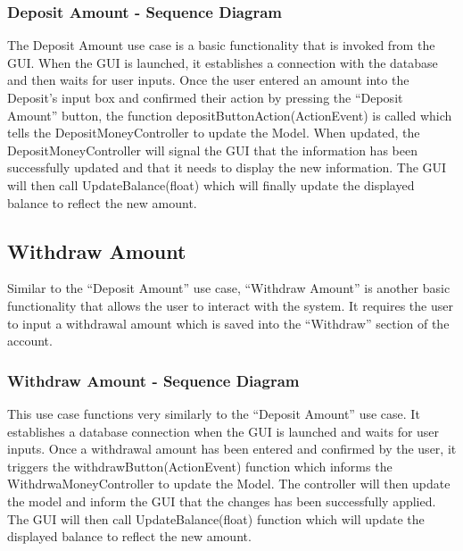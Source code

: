 \documentclass[12pt]{article}
\begin{document}
\subsubsection{Deposit Amount - Sequence Diagram}


The Deposit Amount use case is a basic functionality that is invoked from the GUI. When the GUI is launched, it establishes a connection with the database and then waits for user inputs. Once the user entered an amount into the Deposit’s input box and confirmed their action by pressing the “Deposit Amount” button, the function depositButtonAction(ActionEvent) is called which tells the DepositMoneyController to update the Model. When updated, the DepositMoneyController will signal the GUI that the information has been successfully updated and that it needs to display the new information. The GUI will then call UpdateBalance(float) which will finally update the displayed balance to reflect the new amount.


\subsection{Withdraw Amount}
Similar to the “Deposit Amount” use case, “Withdraw Amount” is another basic functionality that allows the user to interact with the system. It requires the user to input a withdrawal amount which is saved into the “Withdraw” section of the account. 

\subsubsection{Withdraw Amount - Sequence Diagram}

This use case functions very similarly to the “Deposit Amount” use case. It establishes a database connection when the GUI is launched and waits for user inputs. Once a withdrawal amount has been entered and confirmed by the user, it triggers the withdrawButton(ActionEvent) function which informs the WithdrwaMoneyController to update the Model. The controller will then update the model and inform the GUI that the changes has been successfully applied. The GUI will then call UpdateBalance(float) function which will update the displayed balance to reflect the new amount.
\end{document}
